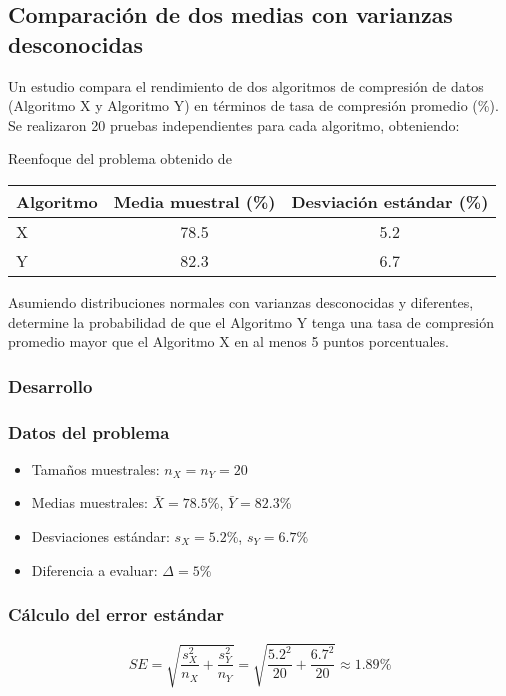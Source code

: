 \newpage


\subsection{Comparación de dos medias con varianzas desconocidas}

Un estudio compara el rendimiento de dos algoritmos de compresión de datos (Algoritmo X y Algoritmo Y) en términos de tasa de compresión promedio (\%). Se realizaron 20 pruebas independientes para cada algoritmo, obteniendo:

Reenfoque del problema obtenido de \cite{LlinasSolano}

\begin{center}
\begin{tabular}{lcc}
\toprule
Algoritmo & Media muestral (\%) & Desviación estándar (\%) \\
\midrule
X & 78.5 & 5.2 \\
Y & 82.3 & 6.7 \\
\bottomrule
\end{tabular}
\end{center}

Asumiendo distribuciones normales con varianzas desconocidas y diferentes, determine la probabilidad de que el Algoritmo Y tenga una tasa de compresión promedio mayor que el Algoritmo X en al menos 5 puntos porcentuales.

\subsubsection*{Desarrollo}
\subsubsection*{Datos del problema}
\begin{itemize}
\item Tamaños muestrales: $n_X = n_Y = 20$
\item Medias muestrales: $\bar{X} = 78.5\%$, $\bar{Y} = 82.3\%$
\item Desviaciones estándar: $s_X = 5.2\%$, $s_Y = 6.7\%$
\item Diferencia a evaluar: $\Delta = 5\%$
\end{itemize}

\subsubsection*{Cálculo del error estándar}
\[
SE = \sqrt{\frac{s_X^2}{n_X} + \frac{s_Y^2}{n_Y}} = \sqrt{\frac{5.2^2}{20} + \frac{6.7^2}{20}} \approx 1.89\%
\]

